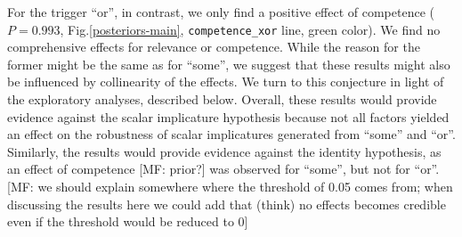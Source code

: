 \documentclass{sp}
\newcommand{\mf}[1]{\textcolor{BurntOrange}{[MF: #1]}}
\begin{document}
For the trigger ``or'', in contrast, we only find a positive effect of competence ($P =  0.993$, Fig.\ref{posteriors-main}, \texttt{competence\_xor} line, green color).  We find no comprehensive effects for relevance or competence. While the reason for the former might be the same as for ``some'', we suggest that these results might also be influenced by collinearity of the effects. We turn to this conjecture in light of the exploratory analyses, described below. 
Overall, these results would provide evidence against the scalar implicature hypothesis because not all factors yielded an effect on the robustness of scalar implicatures generated from ``some'' and ``or''. Similarly, the results would provide evidence against the identity hypothesis, as an effect of competence \mf{prior?} was observed for ``some'', but not for ``or''.\mf{we should explain somewhere where the threshold of 0.05 comes from; when discussing the results here we could add that (think) no effects becomes credible even if the threshold would be reduced to 0}
\end{document}
